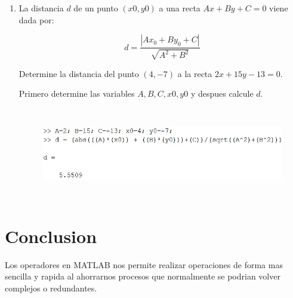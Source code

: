 \documentclass{article}
\begin{document}
\begin{enumerate}
    \item 

    La distancia $d$ de un punto $(x0, y0)$ a una recta $Ax + By + C = 0$ viene dada por:
    
    $$d = \frac{|Ax_0 + By_0 + C|}{\sqrt{A^2 + B^2}}$$
    
    Determine la distancia del punto $(4,−7)$ a la recta $2x+15y−13 = 0$.
    
    Primero determine las variables $A, B, C, x0, y0$ y despues calcule $d$.
    
    \begin{figure}[H]
    \centering
    \includegraphics[height=4cm]{img10.jpg}
    \end{figure}

\end{enumerate}

\newpage

\section{Conclusion}

Los operadores en MATLAB nos permite realizar operaciones de forma mas sencilla y rapida al ahorrarnos procesos que normalmente se podrian volver complejos o redundantes. 
\end{document}
